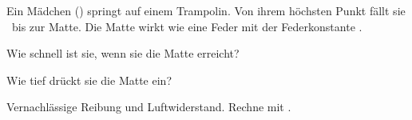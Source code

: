 Ein Mädchen (\mO) springt auf einem Trampolin. Von ihrem höchsten Punkt fällt sie \hFO\ bis zur Matte. Die Matte wirkt wie eine Feder mit der Federkonstante \kO.

\begin{abcliste}
\abc
Wie schnell ist sie, wenn sie die Matte erreicht?

\abc
Wie tief drückt sie die Matte ein?
\end{abcliste}

Vernachlässige Reibung und Luftwiderstand. Rechne mit \gO.
